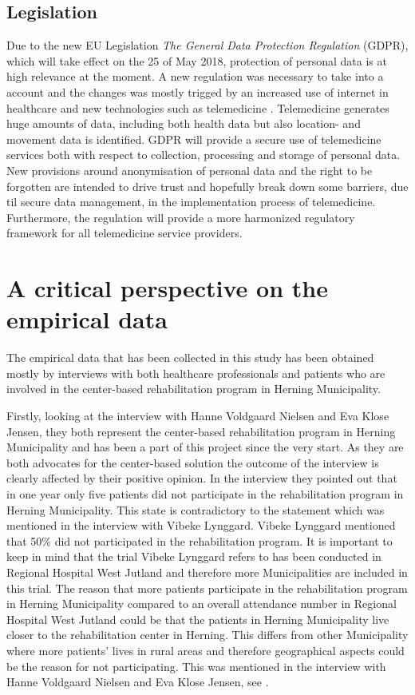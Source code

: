  

\subsection{Legislation} 
Due to the new EU Legislation \textit{The General Data Protection Regulation} (GDPR), which will take effect on the 25 of May 2018, protection of personal data is at high relevance at the moment. A new regulation was necessary to take into a account and the changes was mostly trigged by an increased use of internet in healthcare and new technologies such as telemedicine \cite{GDPR}. Telemedicine generates huge amounts of data, including both health data but also location- and movement data is identified. GDPR will provide a secure use of telemedicine services both with respect to collection, processing and storage of personal data. New provisions around anonymisation of personal data and the right to be forgotten are intended to drive trust and hopefully break down some barriers, due til secure data management, in the implementation process of telemedicine. Furthermore, the regulation will provide a more harmonized regulatory framework for all telemedicine service providers.   




\section{A critical perspective on the empirical data}
 
 The empirical data that has been collected in this study has been obtained mostly by interviews with both healthcare professionals and patients who are involved in the center-based rehabilitation program in Herning Municipality. 

Firstly, looking at the interview with Hanne Voldgaard Nielsen and Eva Klose Jensen, they both represent the center-based rehabilitation program in Herning Municipality and has been a part of this project since the very start. As they are both advocates for the center-based solution the outcome of the interview is clearly affected by their positive opinion. In the interview they pointed out that in one year only five patients did not participate in the rehabilitation program in Herning Municipality. This state is contradictory to the statement which was mentioned in the interview with Vibeke Lynggard. Vibeke Lynggard mentioned that 50\% did not participated in the rehabilitation program. It is important to keep in mind that the trial Vibeke Lynggard refers to has been conducted in Regional Hospital West Jutland and therefore more Municipalities are included in this trial. The reason that more patients participate in the rehabilitation program in Herning Municipality compared to an overall attendance number in Regional Hospital West Jutland could be that the patients in Herning Municipality live closer to the rehabilitation center in Herning. This differs from other Municipality where more patients’ lives in rural areas and therefore geographical aspects could be the reason for not participating. This was mentioned in the interview with Hanne Voldgaard Nielsen and Eva Klose Jensen, see .    

